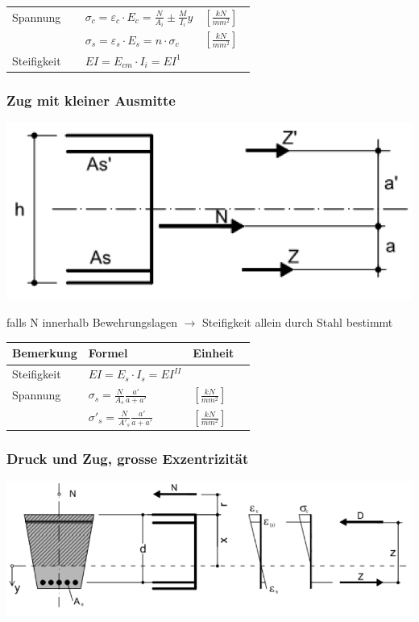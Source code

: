 \begin{multicols}{2}
\begin{tabular}{p{0.3\linewidth}|p{0.3\linewidth}|l}
		
		Spannung		& $ \sigma_c = \varepsilon_c \cdot E_c = \frac{N}{A_i} \pm \frac{M}{I_i}y $	& $ \left[ \frac{kN}{mm^2} \right]$ \\
		& $ \sigma_s = \varepsilon_s \cdot E_s = n \cdot \sigma_c $	& $ \left[ \frac{kN}{mm^2} \right]$ \\
		
		Steifigkeit	& $ EI = E_{cm} \cdot I_i = EI^1 $	& \\
		
	\end{tabular}
	
	
	\subsubsection{Zug mit kleiner Ausmitte}

	
		
	\includegraphics[width=0.4\linewidth]{images/Risse8ZugklEx.PNG}
	
	
	falls N innerhalb Bewehrungslagen $ \rightarrow $ Steifigkeit allein durch Stahl bestimmt
	
	\begin{tabular}{p{0.3\linewidth}|p{0.3\linewidth}|l}
		
		Bemerkung		& Formel		& Einheit \\ \hline
		
		
		Steifigkeit		& $ EI = E_{s} \cdot I_s = EI^{II} $	&	\\
		
		Spannung		& $ \sigma_s = \frac{N}{A_s} \frac{a'}{a + a'} $		& $ \left[ \frac{kN}{mm^2}\right] $ \\	
		
		& $ \sigma'_s = \frac{N}{A'_s} \frac{a'}{a + a'} $	& $ \left[ \frac{kN}{mm^2}\right] $ 
	
	\end{tabular}
	
	
	
	\subsubsection{Druck und Zug, grosse Exzentrizität}
	
	
	\includegraphics[width=0.6\linewidth]{images/Risse7grEx.PNG}
	

\end{multicols}
